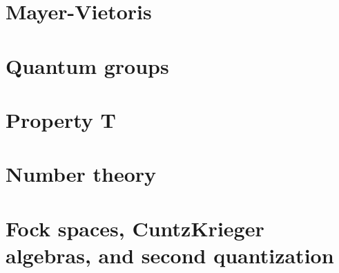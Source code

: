 \section{Mayer-Vietoris}

\section{Quantum groups}

\section{Property T}

\section{Number theory}

\section{Fock spaces, CuntzKrieger algebras, and second quantization}












